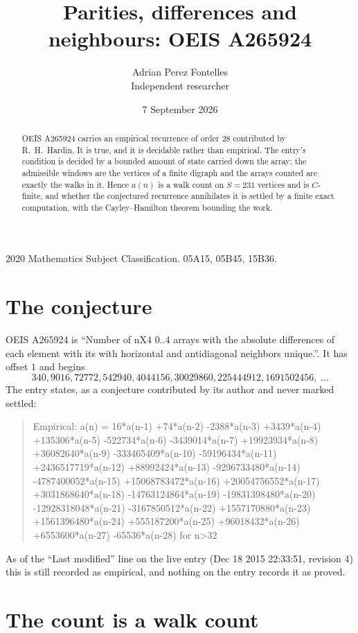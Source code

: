 \documentclass[11pt,a4paper]{article}
\title{Parities, differences and neighbours: OEIS A265924}
\author{Adrian Perez Fontelles\\ \small Independent researcher}
\date{7 September 2026}
\theoremstyle{plain}
\theoremstyle{definition}
\begin{document}
\maketitle

\begin{abstract}
OEIS A265924 carries an empirical recurrence of order $28$ contributed by R.~H.~Hardin. It is
true, and it is decidable rather than empirical. The entry's condition is decided by a bounded amount of state carried down the array; the
admissible windows are the vertices of a finite digraph and the arrays counted are exactly the
walks in it. Hence $a(n)$ is a walk count on $S=231$ vertices and is $C$-finite, and whether the
conjectured recurrence annihilates it is settled by a finite exact computation, with the
Cayley--Hamilton theorem bounding the work.
\end{abstract}

\noindent\small 2020 Mathematics Subject Classification. 05A15, 05B45, 15B36.\normalsize

\section{The conjecture}

OEIS A265924 is ``Number of nX4 0..4 arrays with the absolute differences of each element with its with horizontal and antidiagonal neighbors unique.''. It has offset $1$ and begins
\[
340, 9016, 72772, 542940, 4044156, 30029860, 225444912, 1691502456,\ \dots
\]
The entry states, as a conjecture contributed by its author and never marked settled:
\begin{quote}
Empirical: a(n) = 16*a(n-1) +74*a(n-2) -2388*a(n-3) +3439*a(n-4) +135306*a(n-5) -522734*a(n-6) -3439014*a(n-7) +19923934*a(n-8) +36082640*a(n-9) -333465409*a(n-10) -59196434*a(n-11) +2436517719*a(n-12) +88992424*a(n-13) -9296733480*a(n-14) -4787400052*a(n-15) +15068783472*a(n-16) +20054756552*a(n-17) +3031868640*a(n-18) -14763124864*a(n-19) -19831398480*a(n-20) -12928318048*a(n-21) -3167850512*a(n-22) +1557170880*a(n-23) +1561396480*a(n-24) +555187200*a(n-25) +96018432*a(n-26) +6553600*a(n-27) -65536*a(n-28) for n>32
\end{quote}
As of the ``Last modified'' line on the live entry (Dec 18 2015 22:33:51, revision 4) this is still
recorded as empirical, and nothing on the entry records it as proved.

\section{The count is a walk count}
\end{document}
